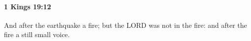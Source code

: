 
		\paragraph{1 Kings 19:12} %
			\label{1KINGS-19-12}

			And after the earthquake a fire; but the LORD was not in the fire: and after the fire a still small voice.


